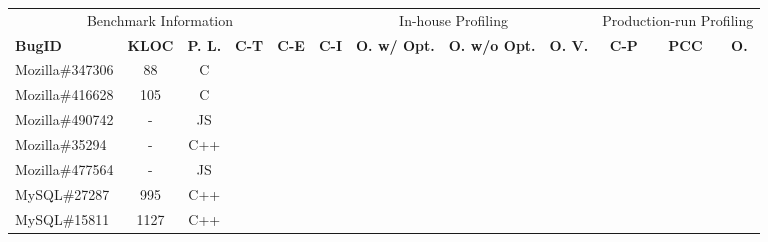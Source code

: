 

\begin{table*}
  \centering
  \scriptsize
  \newcommand{\Yes}[0]{\checkmark}
  \newcommand{\No}[0]{-}
  \begin{tabular}{lcccc|cccc|ccc}
    \toprule
    \multicolumn{5}{c}{Benchmark Information}   & \multicolumn{4}{c}{In-house Profiling }    &\multicolumn{3}{c}{Production-run Profiling}\\
\cline{1-5}
\cline{6-9}
\cline{10-12}
{\bf BugID} & {\bf KLOC} & {\bf P. L.} & {\bf C-T} & {\bf C-E} & {\bf C-I} & {\bf O. w/ Opt.}& {\bf O. w/o Opt.} &  {\bf O. V.} & {\bf C-P} & {\bf PCC}& {\bf O.}  \\
\midrule                                                                                                                                                                                                                                           
Mozilla\#347306   &  88  & C  &  &              &    &                                 &                   &                           &                        &   &        \\
Mozilla\#416628   &  105  & C  &  &              &    &                                 &                   &                           &                        &   &        \\
Mozilla\#490742   &  -  & JS  &  &              &    &                                 &                   &                           &                        &   &        \\
Mozilla\#35294    &  -  & C++  &  &              &    &                                 &                   &                           &                        &   &        \\
Mozilla\#477564   &  -  & JS  &  &              &    &                                 &                   &                           &                        &   &        \\
\midrule
MySQL\#27287      &  995  & C++  &  &              &    &                                 &                   &                           &                        &   &        \\
MySQL\#15811      &  1127 & C++  &  &              &    &                                 &                   &                           &                        &   &        \\

\end{tabular}
\end{table*}
